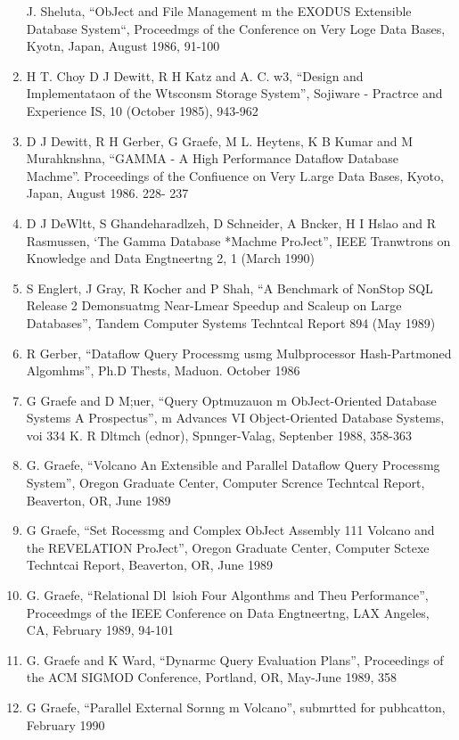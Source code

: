 \documentclass[a4paper,12pt,notitlepage,twoside,openright]{article}
\begin{document}
\begin{enumerate}
  J. Sheluta, “ObJect and File Management m the
  EXODUS Extensible Database System“, Proceedmgs
  of the Conference on Very Loge Data Bases, Kyotn,
  Japan, August 1986, 91-100
  \item
  H T. Choy D J Dewitt, R H Katz and A. C.
  w3, “Design and Implementataon of the Wtsconsm
  Storage System”, Sojiware - Practrce and Experience
  IS, 10 (October 1985), 943-962
  \item
  D J Dewitt, R H Gerber, G Graefe, M L.
  Heytens, K B Kumar and M Murahknshna,
  “GAMMA - A High Performance Dataflow Database
  Machme”. Proceedings of the Confiuence on Very
  L.arge Data Bases, Kyoto, Japan, August 1986. 228-
  237
  \item
  D J DeWltt, S Ghandeharadlzeh, D Schneider, A
  Bncker, H I Hslao and R Rasmussen, ‘The
  Gamma Database *Machme ProJect”, IEEE
  Tranwtrons on Knowledge and Data Engtneertng 2,
  1 (March 1990)
  \item
  S Englert, J Gray, R Kocher and P Shah, “A
  Benchmark of NonStop SQL Release 2 Demonsuatmg
  Near-Lmear Speedup and Scaleup on Large
  Databases”, Tandem Computer Systems Techntcal
  Report 894 (May 1989)
  \item
  R Gerber, “Dataflow Query Processmg usmg
  Mulbprocessor Hash-Partmoned Algomhms”, Ph.D
  Thests, Maduon. October 1986
  \item
  G Graefe and D M;uer, “Query Optmuzauon m
  ObJect-Oriented Database Systems A Prospectus”, m
  Advances VI Object-Oriented Database Systems, voi
  334 K. R Dltmch (ednor), Spnnger-Valag,
  Septenber 1988, 358-363
  \item
  G. Graefe, “Volcano An Extensible and Parallel
  Dataflow Query Processmg System”, Oregon
  Graduate Center, Computer Scrence Techntcal Report,
  Beaverton, OR, June 1989
  \item
  G Graefe, “Set Rocessmg and Complex ObJect
  Assembly 111 Volcano and the REVELATION
  ProJect”, Oregon Graduate Center, Computer Sctexe
  Techntcai Report, Beaverton, OR, June 1989
  \item
  G. Graefe, “Relational Dl~lsioh Four Algonthms
  and Theu Performance”, Proceedmgs of the IEEE
  Conference on Data Engtneertng, LAX Angeles, CA,
  February 1989, 94-101
  \item
  G. Graefe and K Ward, “Dynarmc Query Evaluation
  Plans”, Proceedings of the ACM SIGMOD
  Conference, Portland, OR, May-June 1989, 358
  \item
  G Graefe, “Parallel External Sornng m Volcano”,
  submrtted for pubhcatton, February 1990

\end{enumerate}
\end{document}
